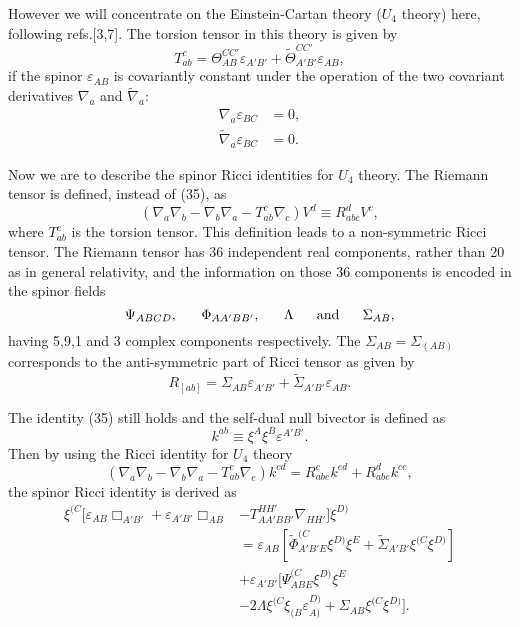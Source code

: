 \documentclass[a4paper,12pt]{article}
\begin{document}
However we will concentrate on the Einstein-Cartan theory ($U_4$ theory) here, following refs.[3,7].
The torsion tensor in this theory is given by
\begin{equation}
T_{ab}^c=\Theta_{AB}^{CC'}\varepsilon_{A'B'}+\tilde\Theta_{A'B'}^{CC'}\varepsilon_{AB},
\end{equation}
if the spinor $\varepsilon_{AB}$ is covariantly constant under the operation of the two covariant derivatives $\nabla_a$ and $\tilde\nabla_a$:
\begin{align}
\nabla_a\varepsilon_{BC}&=0,\\
\tilde\nabla_a\varepsilon_{BC}&=0.
\end{align}

Now we are to describe the spinor Ricci identities for $U_4$ theory.
The Riemann tensor is defined, instead of (35), as
\begin{equation}
(\nabla_a\nabla_b-\nabla_b\nabla_a-T_{ab}^c\nabla_c)V^d\equiv R_{abc}^dV^c,
\end{equation}
where $T_{ab}^c$ is the torsion tensor. This definition leads to a non-symmetric Ricci tensor. The Riemann tensor has 36 independent real components, rather than 20 as in general relativity, and the information on those 36 components is encoded in the spinor fields
\begin{equation}
\Psi_{ABCD},\ \ \ \ \ \Phi_{AA'BB'},\ \ \ \ \ \Lambda\ \ \ \ \ {\rm and}\ \ \ \ \ \Sigma_{AB},
\end{equation}
having 5,9,1 and 3 complex components respectively. The $\Sigma_{AB}=\Sigma_{(AB)}$ corresponds to the anti-symmetric part of Ricci tensor as given by
\begin{equation}
R_{[ab]}=\Sigma_{AB}\varepsilon_{A'B'}+\tilde\Sigma_{A'B'}\varepsilon_{AB}.
\end{equation}

The identity (35) still holds and the self-dual null bivector is defined as
\begin{equation}
k^{ab}\equiv \xi^A\xi^B\varepsilon^{A'B'}.
\end{equation}
Then by using the Ricci identity for $U_4$ theory
\begin{equation}
(\nabla_a\nabla_b-\nabla_b\nabla_a-T_{ab}^e\nabla_e)k^{cd}= R_{abe}^ck^{ed}+R_{abe}^dk^{ce},
\end{equation}
the spinor Ricci identity is derived as
\begin{equation}
\begin{split}
\xi^{(C}[\varepsilon_{AB}\Box_{A'B'}+\varepsilon_{A'B'}\Box_{AB}&-T_{AA'BB'}^{HH'}\nabla_{HH'}]\xi^{D)}\\ 
&=\varepsilon_{AB}[\tilde\Phi_{A'B'E}^{(C}\xi^{D)}\xi^E+\tilde\Sigma_{A'B'}\xi^{(C}\xi^{D)}]\\
&+\varepsilon_{A'B'}[\Psi_{ABE}^{(C}\xi^{D)}\xi^E\\ 
&-2\Lambda\xi^{(C}\xi_{(B}\varepsilon_{A)}^{D)}+\Sigma_{AB}\xi^{(C}\xi^{D)}].
\end{split}
\end{equation}
\end{document}
